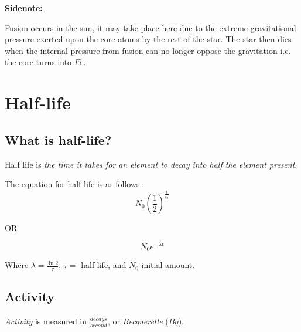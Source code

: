 \documentclass[12pt]{article}
\begin{document}
\begin{boxA}

	\textbf{\underline{Sidenote:}} \bigbreak

Fusion occurs in the sun, it may take place here due to the
extreme gravitational pressure exerted upon the core atoms
 by the rest of the star. The star then dies when the 
 internal pressure from fusion can no longer oppose the gravitation
 i.e. the core turns into $Fe$.

\end{boxA}

\newpage

\section{Half-life}

\subsection{What is half-life?}

Half life is \emph{the time it takes for an element to 
decay into half the element present}. \bigbreak

The equation for half-life is as follows: 
$$N_0\left(\frac{1}{2} \right)^\frac{t}{t_d}$$

\begin{center}
OR
\end{center}
$$N_0 e^{-\lambda t}$$ 

\begin{center}
	Where $\lambda = \frac{\ln{2}}{\tau}$, $\tau=$ half-life, and $N_0$ initial amount.
\end{center}

\bigbreak

\begin{center}
\end{center}



\subsection{Activity}
\emph{Activity} is measured in $\frac{decays}{second}$, or 
\emph{Becquerelle} ($Bq$). \bigbreak
\end{document}
